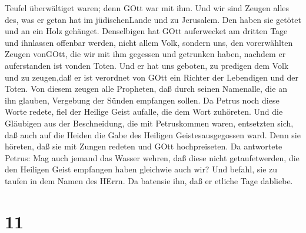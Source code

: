 Teufel überwältiget waren; denn GOtt war mit ihm.  Und wir
sind Zeugen alles des, was er getan hat im jüdischenLande und zu
Jerusalem. Den haben sie getötet und an ein Holz gehänget. 
Denselbigen hat GOtt auferwecket am dritten Tage und ihnlassen offenbar
werden,  nicht allem Volk, sondern uns, den vorerwählten
Zeugen vonGOtt, die wir mit ihm gegessen und getrunken haben, nachdem er
auferstanden ist vonden Toten.  Und er hat uns geboten, zu
predigen dem Volk und zu zeugen,daß er ist verordnet von GOtt ein
Richter der Lebendigen und der Toten.  Von diesem zeugen
alle Propheten, daß durch seinen Namenalle, die an ihn glauben,
Vergebung der Sünden empfangen sollen.  Da Petrus noch
diese Worte redete, fiel der Heilige Geist aufalle, die dem Wort
zuhöreten.  Und die Gläubigen aus der Beschneidung, die mit
Petruskommen waren, entsetzten sich, daß auch auf die Heiden die Gabe
des Heiligen Geistesausgegossen ward.  Denn sie höreten,
daß sie mit Zungen redeten und GOtt hochpreiseten. Da antwortete Petrus:
 Mag auch jemand das Wasser wehren, daß diese nicht
getaufetwerden, die den Heiligen Geist empfangen haben gleichwie auch
wir?  Und befahl, sie zu taufen in dem Namen des HErrn. Da
batensie ihn, daß er etliche Tage dabliebe.

\hypertarget{section-10}{%
\section{11}\label{section-10}}

